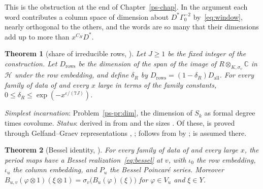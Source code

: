 \documentclass[reqno]{amsart}
\newcounter{chap}
\theoremstyle{definition}
\theoremstyle{plain}
\newtheorem{theorem}{Theorem}[section]
\newcommand{\C}{\mathbb{C}}
\newcommand{\Hc}{\mathcal{H}}
\newcommand{\Dall}{D_{\mathrm{all}}}
\newcommand{\Drows}{D_{\mathrm{rows}}}
\begin{document}
This is the obstruction at the end of Chapter~\ref{ps-chap}.  In the argument each word contributes a column space of dimension about \(D^*\Gamma_0^{-2}\) by~\eqref{eq:window}, nearly orthogonal to the others, and the words are so many that their dimensions add up to more than \(x^{C_H}D^*\).

\begin{theorem}[share of irreducible rows, {\cite[Thm.~14.2]{Adr}}]\label{thm:rows}
Let \(J \ge 1\) be the fixed integer of the construction.  Let \(\Drows\) be the dimension of the span of the image of \(R \otimes_{K,\sigma_v} \C\) in \(\Hc\) under the row embedding, and define \(\delta_R\) by \(\Drows = (1 - \delta_R)\Dall\).  For every family of data of \cite[Part~II]{Adr} and every \(x\) large in terms of the family constants, \(0 \le \delta_R \le \exp(-x^{\varepsilon/(7J)})\).
\end{theorem}

\emph{Simplest incarnation}: Problem~\ref{ps-pr:dim}, the dimension of \(S_k\) as formal degree times covolume.  \emph{Status}: derived in \cite[Thm.~14.46]{Adr} from \cite[Hyps.~14.42--14.44]{Adr} and the sizes \cite[Lemma~14.64]{Adr}.  Of these, \cite[Hyp.~14.42]{Adr} is proved \cite[Cor.~14.57]{Adr} through Gelfand--Graev representations \cite[\S10]{DL}, \cite[Ch.~8]{Cart}; \cite[Hyp.~14.43]{Adr} follows from \cite[Hyps.~14.59 and~14.61]{Adr} by \cite[Cor.~14.63]{Adr}; \cite[Hyp.~14.44]{Adr} is assumed there.

\begin{theorem}[Bessel identity, {\cite[Thm.~14.3]{Adr}}]\label{thm:bessel}
For every family of data of \cite[Part~II]{Adr} and every large \(x\), the period maps have a Bessel realization~\eqref{eq:bessel} at \(v\), with \(\iota_0\) the row embedding, \(\iota_u\) the column embedding, and \(P_u\) the Bessel Poincar\'e series.  Moreover \(B_{u,v}(\varphi \otimes 1)(\xi \otimes 1) = \sigma_v\bigl(B_u(\varphi)(\xi)\bigr)\) for \(\varphi \in V_u\) and \(\xi \in Y\).
\end{theorem}
\end{document}
